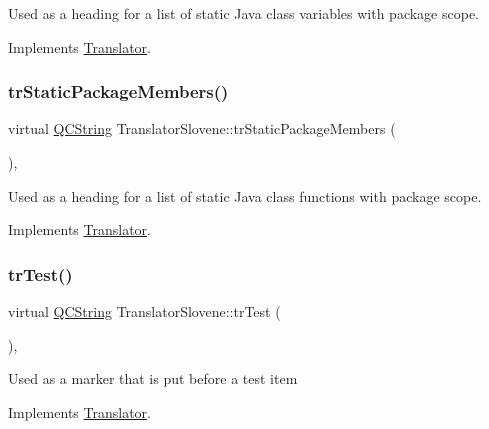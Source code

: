 Used as a heading for a list of static Java class variables with package scope. 

Implements \mbox{\hyperlink{class_translator}{Translator}}.

\mbox{\label{class_translator_slovene_a32d8258c4d2f48fbc8e65648f0c796f9}} 
\subsubsection{\texorpdfstring{trStaticPackageMembers()}{trStaticPackageMembers()}}
{\footnotesize\ttfamily virtual \mbox{\hyperlink{class_q_c_string}{Q\+C\+String}} Translator\+Slovene\+::tr\+Static\+Package\+Members (\begin{DoxyParamCaption}{ }\end{DoxyParamCaption})\hspace{0.3cm}{\ttfamily [inline]}, {\ttfamily [virtual]}}

Used as a heading for a list of static Java class functions with package scope. 

Implements \mbox{\hyperlink{class_translator}{Translator}}.

\mbox{\label{class_translator_slovene_a05b84fb4d4a609fa630792cce27a067f}} 
\subsubsection{\texorpdfstring{trTest()}{trTest()}}
{\footnotesize\ttfamily virtual \mbox{\hyperlink{class_q_c_string}{Q\+C\+String}} Translator\+Slovene\+::tr\+Test (\begin{DoxyParamCaption}{ }\end{DoxyParamCaption})\hspace{0.3cm}{\ttfamily [inline]}, {\ttfamily [virtual]}}

Used as a marker that is put before a test item 

Implements \mbox{\hyperlink{class_translator}{Translator}}.

\mbox{\label{class_translator_slovene_a6b30c8004a89d8923af9116afcd47354}} 
